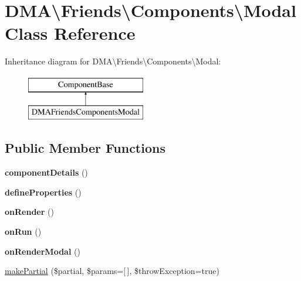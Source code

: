 \hypertarget{classDMA_1_1Friends_1_1Components_1_1Modal}{\section{D\-M\-A\textbackslash{}Friends\textbackslash{}Components\textbackslash{}Modal Class Reference}
\label{classDMA_1_1Friends_1_1Components_1_1Modal}
}
Inheritance diagram for D\-M\-A\textbackslash{}Friends\textbackslash{}Components\textbackslash{}Modal\-:\begin{figure}[H]
\begin{center}
\leavevmode
\includegraphics[height=2.000000cm]{df/da2/classDMA_1_1Friends_1_1Components_1_1Modal}
\end{center}
\end{figure}
\subsection*{Public Member Functions}
\begin{DoxyCompactItemize}
\item 
\hypertarget{classDMA_1_1Friends_1_1Components_1_1Modal_ad951492cf8acea02e0eaf24a029c0851}{{\bfseries component\-Details} ()}\label{classDMA_1_1Friends_1_1Components_1_1Modal_ad951492cf8acea02e0eaf24a029c0851}

\item 
\hypertarget{classDMA_1_1Friends_1_1Components_1_1Modal_aa109062a7350b8bd5dd168ede6aafd76}{{\bfseries define\-Properties} ()}\label{classDMA_1_1Friends_1_1Components_1_1Modal_aa109062a7350b8bd5dd168ede6aafd76}

\item 
\hypertarget{classDMA_1_1Friends_1_1Components_1_1Modal_ac8ccab598d85dc5339912bd627cd51a8}{{\bfseries on\-Render} ()}\label{classDMA_1_1Friends_1_1Components_1_1Modal_ac8ccab598d85dc5339912bd627cd51a8}

\item 
\hypertarget{classDMA_1_1Friends_1_1Components_1_1Modal_aed8e6b9a32f34a292d8a64619d483786}{{\bfseries on\-Run} ()}\label{classDMA_1_1Friends_1_1Components_1_1Modal_aed8e6b9a32f34a292d8a64619d483786}

\item 
\hypertarget{classDMA_1_1Friends_1_1Components_1_1Modal_a524d66800c7799a474a280e6fa77933c}{{\bfseries on\-Render\-Modal} ()}\label{classDMA_1_1Friends_1_1Components_1_1Modal_a524d66800c7799a474a280e6fa77933c}

\item 
\hyperlink{classDMA_1_1Friends_1_1Components_1_1Modal_a4e45e161a2624a34d59bf56294122ced}{make\-Partial} (\$partial, \$params=\mbox{[}$\,$\mbox{]}, \$throw\-Exception=true)
\end{DoxyCompactItemize}
